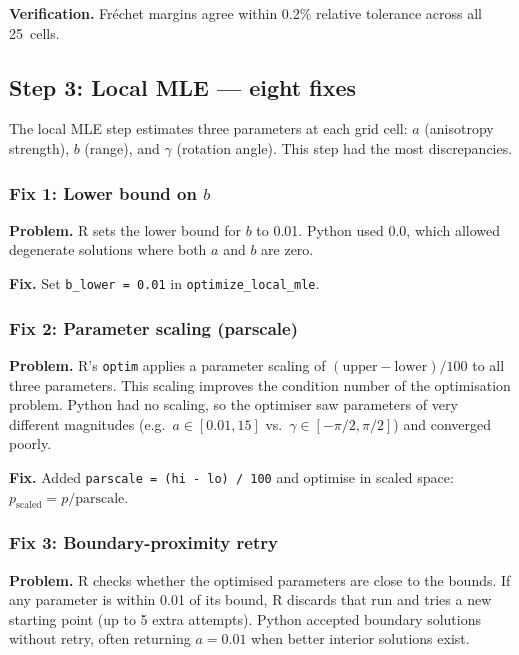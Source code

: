 \documentclass[12pt,a4paper]{article}
\begin{document}
\textbf{Verification.}
Fr\'echet margins agree within 0.2\% relative tolerance across all
25~cells.

\subsection{Step 3: Local MLE --- eight fixes}
\label{sec:fix-mle}

The local MLE step estimates three parameters at each grid cell:
$a$ (anisotropy strength), $b$ (range), and $\gamma$ (rotation
angle).  This step had the most discrepancies.

\subsubsection{Fix 1: Lower bound on $b$}

\textbf{Problem.}
R sets the lower bound for $b$ to 0.01.  Python used 0.0, which
allowed degenerate solutions where both $a$ and $b$ are zero.

\textbf{Fix.}
Set \texttt{b\_lower = 0.01} in \texttt{optimize\_local\_mle}.

\subsubsection{Fix 2: Parameter scaling (parscale)}

\textbf{Problem.}
R's \texttt{optim} applies a parameter scaling of
$(\text{upper} - \text{lower}) / 100$ to all three parameters.
This scaling improves the condition number of the optimisation
problem.  Python had no scaling, so the optimiser saw parameters
of very different magnitudes (e.g.\ $a \in [0.01, 15]$ vs.\
$\gamma \in [-\pi/2, \pi/2]$) and converged poorly.

\textbf{Fix.}
Added \texttt{parscale = (hi - lo) / 100} and optimise in scaled
space: $p_{\text{scaled}} = p / \text{parscale}$.

\subsubsection{Fix 3: Boundary-proximity retry}

\textbf{Problem.}
R checks whether the optimised parameters are close to the bounds.
If any parameter is within 0.01 of its bound, R discards that run
and tries a new starting point (up to 5 extra attempts).  Python
accepted boundary solutions without retry, often returning $a = 0.01$
when better interior solutions exist.
\end{document}
